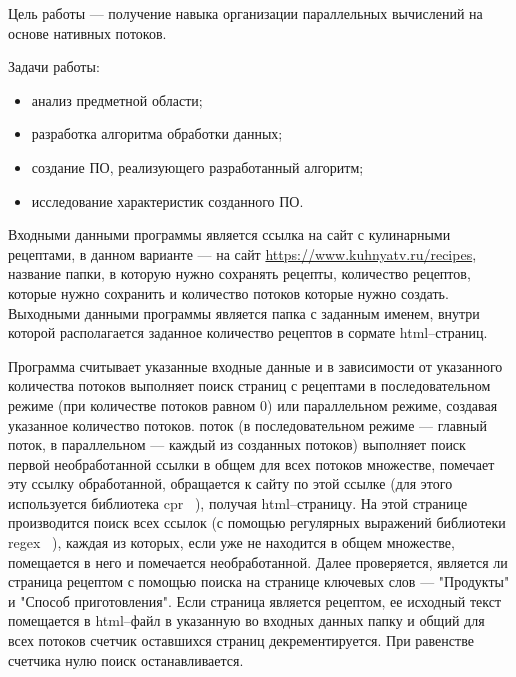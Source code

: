 

Цель работы --- получение навыка организации параллельных вычислений на основе нативных потоков.

Задачи работы:
\begin{itemize}
    \item анализ предметной области;
    \item разработка алгоритма обработки данных;
    \item создание ПО, реализующего разработанный алгоритм;
    \item исследование характеристик созданного ПО.
\end{itemize}


Входными данными программы является ссылка на сайт с кулинарными рецептами, в данном варианте --- на сайт \url{https://www.kuhnyatv.ru/recipes}, название папки, в которую нужно сохранять рецепты, количество рецептов, которые нужно сохранить и количество потоков которые нужно создать. Выходными данными программы является папка с заданным именем, внутри которой располагается заданное количество рецептов в сормате html--страниц.


Программа считывает указанные входные данные и в зависимости от указанного количества потоков выполняет поиск страниц с рецептами в последовательном режиме (при количестве потоков равном 0) или параллельном режиме, создавая указанное количество потоков.
 поток (в последовательном режиме --- главный поток, в параллельном --- каждый из созданных потоков) выполняет поиск первой необработанной ссылки в общем для всех потоков множестве, помечает эту ссылку обработанной, обращается к сайту по этой ссылке (для этого используется библиотека cpr ~\cite{cpr_lib}), получая html--страницу. На этой странице производится поиск всех ссылок (с помощью регулярных выражений библиотеки regex ~\cite{regex_lib}), каждая из которых, если уже не находится в общем множестве, помещается в него и помечается необработанной. Далее проверяется, является ли страница рецептом с помощью поиска на странице ключевых слов --- "Продукты" и "Способ приготовления". Если страница является рецептом, ее исходный текст помещается в html--файл в указанную во входных данных папку и общий для всех потоков счетчик оставшихся страниц декрементируется. При равенстве счетчика нулю поиск останавливается.

